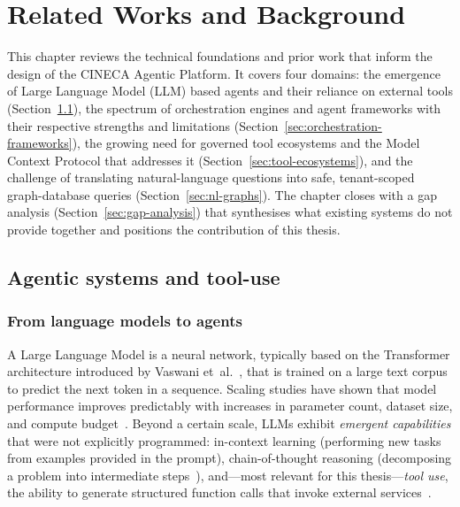 \documentclass[a4paper,noexaminfo]{sapthesis}
\begin{document}
\chapter{Related Works and Background}
\label{ch:background}

This chapter reviews the technical foundations and prior work that inform the
design of the CINECA Agentic Platform.  It covers four domains: the emergence
of Large Language Model (LLM) based agents and their reliance on external
tools (Section~\ref{sec:agentic-systems}), the spectrum of orchestration
engines and agent frameworks with their respective strengths and limitations
(Section~\ref{sec:orchestration-frameworks}), the growing need for governed
tool ecosystems and the Model Context Protocol that addresses it
(Section~\ref{sec:tool-ecosystems}), and the challenge of translating
natural-language questions into safe, tenant-scoped graph-database queries
(Section~\ref{sec:nl-graphs}).  The chapter closes with a gap analysis
(Section~\ref{sec:gap-analysis}) that synthesises what existing systems do
not provide together and positions the contribution of this thesis.

\section{Agentic systems and tool-use}
\label{sec:agentic-systems}

\subsection{From language models to agents}

A Large Language Model is a neural network, typically based on the
Transformer architecture introduced by Vaswani et~al.~\cite{vaswani2017attention},
that is trained on a large text corpus to predict the next token in a
sequence.  Scaling studies have shown that model performance improves
predictably with increases in parameter count, dataset size, and compute
budget~\cite{kaplan2020scaling}.  Beyond a certain scale, LLMs exhibit
\emph{emergent capabilities} that were not explicitly programmed: in-context
learning (performing new tasks from examples provided in the prompt),
chain-of-thought reasoning (decomposing a problem into intermediate
steps~\cite{wei2022chain}), and---most relevant for this
thesis---\emph{tool use}, the ability to generate structured function calls
that invoke external services~\cite{schick2023toolformer}.
\end{document}
